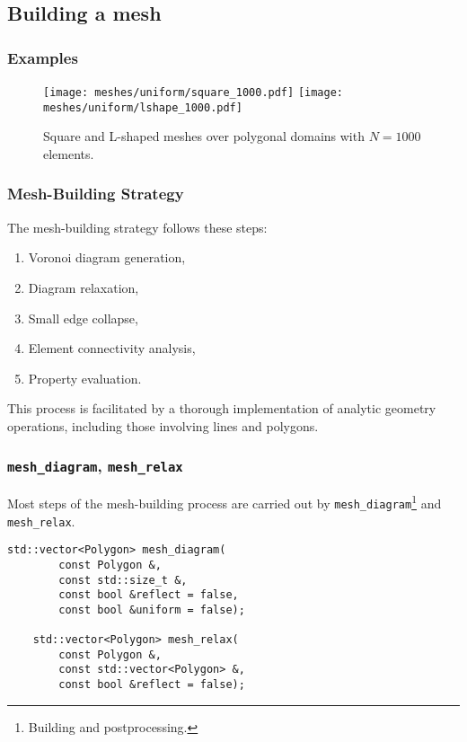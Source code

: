 \subsection{Building a mesh}

\begin{frame}
    \frametitle{Examples}

    \begin{figure}[!ht]
        \centering
        \texttt{[image: meshes/uniform/square\_1000.pdf]}
        \texttt{[image: meshes/uniform/lshape\_1000.pdf]}
        \caption{Square and L-shaped meshes over polygonal domains with $N = 1000$ elements.}
    \end{figure}
\end{frame}

\begin{frame}
    \frametitle{Mesh-Building Strategy}

    The mesh-building strategy follows these steps:

    \begin{enumerate}
        \item Voronoi diagram generation,
        \item Diagram relaxation,
        \item Small edge collapse,
        \item Element connectivity analysis,
        \item Property evaluation.
    \end{enumerate}

    This process is facilitated by a thorough implementation of analytic geometry operations, including those involving lines and polygons.
\end{frame}

\begin{frame}[fragile]
    \frametitle{\lstinline{mesh_diagram}, \lstinline{mesh_relax}}

    Most steps of the mesh-building process are carried out by \lstinline{mesh_diagram}\footnote{Building and postprocessing.} and \lstinline{mesh_relax}.

    \begin{lstlisting}[style=cpp]
    std::vector<Polygon> mesh_diagram(
        const Polygon &, 
        const std::size_t &, 
        const bool &reflect = false, 
        const bool &uniform = false);

    std::vector<Polygon> mesh_relax(
        const Polygon &, 
        const std::vector<Polygon> &, 
        const bool &reflect = false);
    \end{lstlisting}

\end{frame}

